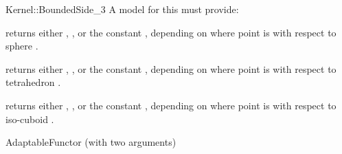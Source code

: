 \begin{ccRefFunctionObjectConcept}{Kernel::BoundedSide_3}
A model for this must provide:


{returns either ,
, or the constant
, depending on where point  is with
respect to sphere . }

{returns either ,
, or the constant
, depending on where point  is with
respect to tetrahedron . }

{returns either ,
, or the constant
, depending on where point  is with
respect to iso-cuboid . }

\ccRefines
AdaptableFunctor (with two arguments)

\ccSeeAlso
{} \\
 \\
 \\

\end{ccRefFunctionObjectConcept}
